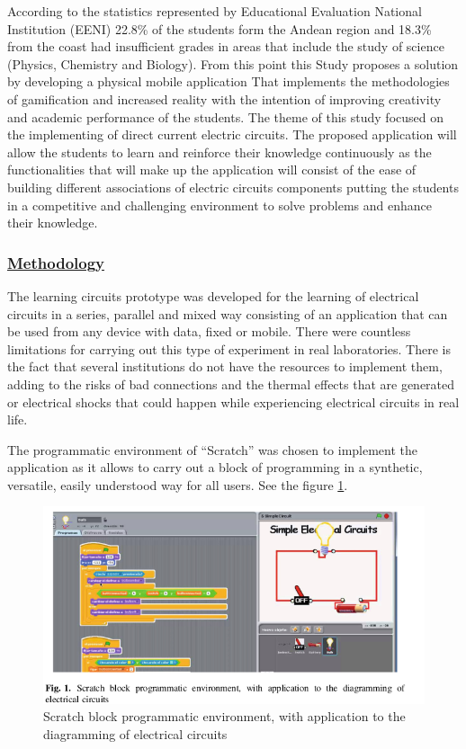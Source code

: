 \documentclass[../main.tex]{subfiles}
\begin{document}
According to the statistics represented by Educational Evaluation National Institution (EENI) 22.8\% of the students form the Andean region and 18.3\% from the coast had insufficient grades in areas that include the study of science (Physics, Chemistry and Biology). From this point this Study proposes a solution by developing a physical mobile application That implements the methodologies of gamification and increased reality with the intention of improving creativity and academic performance of the students. The theme of this study focused on the implementing of direct current electric circuits. The proposed application will allow the students to learn and reinforce their knowledge continuously as the functionalities that will make up the application will consist of the ease of building different associations of electric circuits components putting the students in a competitive and challenging environment to solve problems and enhance their knowledge. 

\subsubsection*{\underline{Methodology}}

The learning circuits prototype was developed for the learning of electrical circuits in a series, parallel and mixed way consisting of an application that can be used from any device with data, fixed or mobile. There were countless limitations for carrying out this type of experiment in real laboratories. There is the fact that several institutions do not have the resources to implement them, adding to the risks of bad connections and the thermal effects that are generated or electrical shocks that could happen while experiencing electrical circuits in real life. 

The programmatic environment of “Scratch” was chosen to implement the application as it allows to carry out a block of programming in a synthetic, versatile, easily understood way for all users. See the figure \ref{fig:Scratch block programmatic environment, with application to the diagramming of electrical circuits}.

\begin{figure}[!ht]
\centering
\includegraphics[scale=0.3]{images/chapter2/image4.png}
\caption{Scratch block programmatic environment, with application to the diagramming of electrical circuits}
\label{fig:Scratch block programmatic environment, with application to the diagramming of electrical circuits}
\end{figure}
\end{document}
